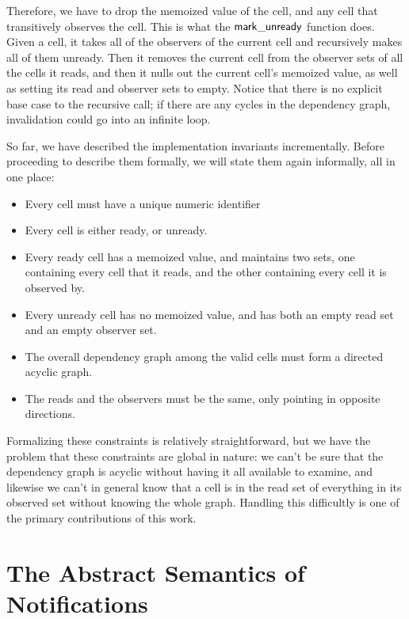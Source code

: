 Therefore, we have to drop the memoized value of the cell, and any
cell that transitively observes the cell. This is what the
$\mathsf{mark\_unready}$ function does. Given a cell, it takes all of the
observers of the current cell and recursively makes all of
them unready. Then it removes the current cell from the observer sets of
all the cells it reads, and then it nulls out the current cell's
memoized value, as well as setting its read and observer sets to
empty. Notice that there is no explicit base case to the recursive
call; if there are any cycles in the dependency graph, invalidation
could go into an infinite loop. 

So far, we have described the implementation invariants incrementally.
Before proceeding to describe them formally, we will state them again
informally, all in one place:

\begin{itemize}
  \item Every cell must have a unique numeric identifier
  \item Every cell is either ready, or unready. 
  \item Every ready cell has a memoized value, and maintains 
    two sets, one containing every cell that it reads, and the
    other containing every cell it is observed by. 
  \item Every unready cell has no memoized value, and has 
    both an empty read set and an empty observer set. 
  \item The overall dependency graph among the valid cells must form a
    directed acyclic graph. 
  \item The reads and the observers must be the same, only 
    pointing in opposite directions.
\end{itemize}

Formalizing these constraints is relatively straightforward, but we
have the problem that these constraints are global in nature:
we can't be sure that the dependency graph is acyclic without having
it all available to examine, and likewise we can't in general know
that a cell is in the read set of everything in its observed set
without knowing the whole graph. Handling this difficultly is one of
the primary contributions of this work. 

\section{The Abstract Semantics of Notifications}

